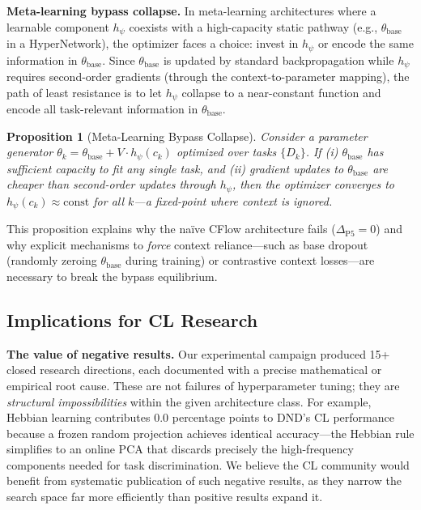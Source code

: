 \documentclass{article}
\newtheorem{proposition}[theorem]{Proposition}
\begin{document}
\textbf{Meta-learning bypass collapse.} In meta-learning architectures where a learnable component $h_\psi$ coexists with a high-capacity static pathway (e.g., $\theta_\mathrm{base}$ in a HyperNetwork), the optimizer faces a choice: invest in $h_\psi$ or encode the same information in $\theta_\mathrm{base}$. Since $\theta_\mathrm{base}$ is updated by standard backpropagation while $h_\psi$ requires second-order gradients (through the context-to-parameter mapping), the path of least resistance is to let $h_\psi$ collapse to a near-constant function and encode all task-relevant information in $\theta_\mathrm{base}$.

\begin{proposition}[Meta-Learning Bypass Collapse]
\label{prop:bypass}
Consider a parameter generator $\theta_k = \theta_\mathrm{base} + V \cdot h_\psi(c_k)$ optimized over tasks $\{D_k\}$. If (i) $\theta_\mathrm{base}$ has sufficient capacity to fit any single task, and (ii) gradient updates to $\theta_\mathrm{base}$ are cheaper than second-order updates through $h_\psi$, then the optimizer converges to $h_\psi(c_k) \approx \mathrm{const}$ for all $k$---a fixed-point where context is ignored.
\end{proposition}

This proposition explains why the na\"ive CFlow architecture fails ($\Delta_\mathrm{P5} = 0$) and why explicit mechanisms to \emph{force} context reliance---such as base dropout (randomly zeroing $\theta_\mathrm{base}$ during training) or contrastive context losses---are necessary to break the bypass equilibrium.

\subsection{Implications for CL Research}
\label{sec:implications}

\textbf{The value of negative results.}
Our experimental campaign produced 15+ closed research directions, each documented with a precise mathematical or empirical root cause. These are not failures of hyperparameter tuning; they are \emph{structural impossibilities} within the given architecture class. For example, Hebbian learning contributes 0.0 percentage points to DND's CL performance because a frozen random projection achieves identical accuracy---the Hebbian rule simplifies to an online PCA that discards precisely the high-frequency components needed for task discrimination. We believe the CL community would benefit from systematic publication of such negative results, as they narrow the search space far more efficiently than positive results expand it.
\end{document}
